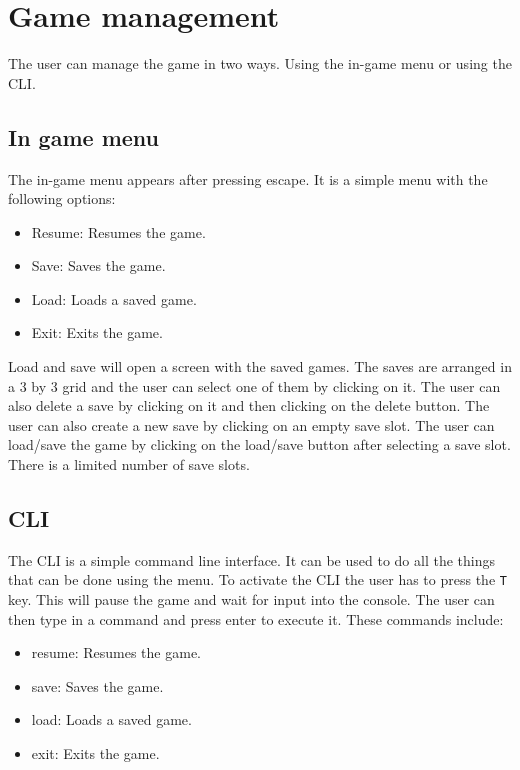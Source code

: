 \section{Game management}

The user can manage the game in two ways.
Using the in-game menu or using the CLI.

\subsection{In game menu}
The in-game menu appears after pressing escape.
It is a simple menu with the following options:

\begin{itemize}
    \item Resume: Resumes the game.
    \item Save: Saves the game.
    \item Load: Loads a saved game.
    \item Exit: Exits the game.
\end{itemize}

Load and save will open a screen with the saved games.
The saves are arranged in a 3 by 3 grid and the user can select one of them by clicking on it.
The user can also delete a save by clicking on it and then clicking on the delete button.
The user can also create a new save by clicking on an empty save slot.
The user can load/save the game by clicking on the load/save button after selecting a save slot.
There is a limited number of save slots.

\subsection{CLI}
The CLI is a simple command line interface.
It can be used to do all the things that can be done using the menu.
To activate the CLI the user has to press the \texttt{T} key.
This will pause the game and wait for input into the console.
The user can then type in a command and press enter to execute it.
These commands include:

\begin{itemize}
    \item resume: Resumes the game.
    \item save: Saves the game.
    \item load: Loads a saved game.
    \item exit: Exits the game.
\end{itemize}